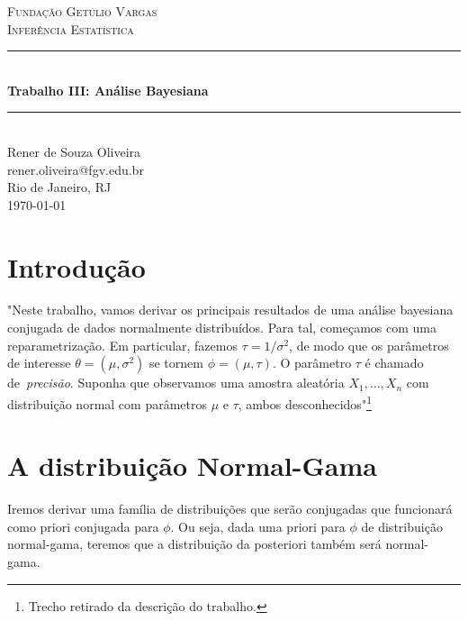 \documentclass[a4paper]{article}
\begin{document}
\newtheorem{definition}{Definição}
\newtheorem{theorem}{Teorema}
\newtheorem{identity}{Identidade}
\begin{titlepage}
\newcommand{\HRule}{\rule{\linewidth}{0.5mm}} 							%
\center 
 
\vfill
\textsc{\LARGE Fundação Getúlio Vargas}\\[1cm]

\textsc{\Large Inferência Estatística}\\[0.2cm]
\HRule \\[0.8cm]
{ \huge \bfseries Trabalho III: Análise Bayesiana}\\[0.7cm]								%
\HRule \\[2cm]
\large
Rener de Souza Oliveira\\
rener.oliveira@fgv.edu.br\\[1.5cm]
Rio de Janeiro, RJ\\
{\large \today}\\[5cm]
\vfill 
\end{titlepage}


\tableofcontents

\newpage
\section{Introdução}
 "Neste trabalho, vamos derivar os principais resultados de uma análise bayesiana conjugada de dados normalmente distribuídos.
 Para tal, começamos com uma reparametrização.
 Em particular, fazemos $\tau = 1/\sigma^2$, de modo que os parâmetros de interesse $\theta = (\mu, \sigma^2)$ se tornem $\phi = (\mu, \tau)$.
 O parâmetro $\tau$ é chamado de~\textit{precisão}.
 Suponha que observamos uma amostra aleatória $X_1, \ldots, X_n$ com distribuição normal com parâmetros $\mu$ e $\tau$, ambos desconhecidos"\footnote{Trecho retirado da descrição do trabalho.}
 
\section{A distribuição Normal-Gama}
 Iremos derivar uma família de distribuições que serão conjugadas que funcionará como priori conjugada para $\phi$. Ou seja, dada uma priori para $\phi$ de distribuição normal-gama, teremos que a distribuição da posteriori também será normal-gama.
 
\end{document}
